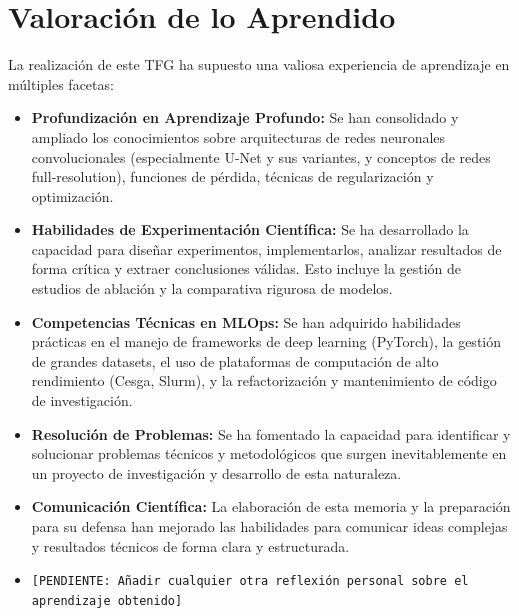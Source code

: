 \documentclass[11pt,a4paper]{report} %
\begin{document}
\section{Valoración de lo Aprendido}
La realización de este TFG ha supuesto una valiosa experiencia de aprendizaje en múltiples facetas:
\begin{itemize}
    \item \textbf{Profundización en Aprendizaje Profundo:} Se han consolidado y ampliado los conocimientos sobre arquitecturas de redes neuronales convolucionales (especialmente U-Net y sus variantes, y conceptos de redes full-resolution), funciones de pérdida, técnicas de regularización y optimización.
    \item \textbf{Habilidades de Experimentación Científica:} Se ha desarrollado la capacidad para diseñar experimentos, implementarlos, analizar resultados de forma crítica y extraer conclusiones válidas. Esto incluye la gestión de estudios de ablación y la comparativa rigurosa de modelos.
    \item \textbf{Competencias Técnicas en MLOps:} Se han adquirido habilidades prácticas en el manejo de frameworks de deep learning (PyTorch), la gestión de grandes datasets, el uso de plataformas de computación de alto rendimiento (Cesga, Slurm), y la refactorización y mantenimiento de código de investigación.
    \item \textbf{Resolución de Problemas:} Se ha fomentado la capacidad para identificar y solucionar problemas técnicos y metodológicos que surgen inevitablemente en un proyecto de investigación y desarrollo de esta naturaleza.
    \item \textbf{Comunicación Científica:} La elaboración de esta memoria y la preparación para su defensa han mejorado las habilidades para comunicar ideas complejas y resultados técnicos de forma clara y estructurada.
    \item \texttt{[PENDIENTE: Añadir cualquier otra reflexión personal sobre el aprendizaje obtenido]}
\end{itemize}
\end{document}
